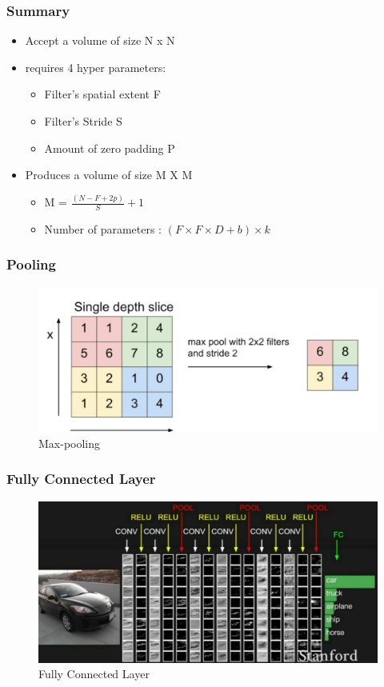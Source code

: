 \documentclass{beamer}
\begin{document}
\begin{frame}
\frametitle{Summary}
\begin{itemize}
	\item Accept a volume of size N x N 
	\item requires 4 hyper parameters:
	\begin{itemize}
		\item Filter's spatial extent F
		\item Filter's Stride S
		\item Amount of zero padding P
	\end{itemize}
	
     \item Produces a volume of size M X M
     \begin{itemize}
     	\item M = $ \frac{(N - F + 2p)}{S} + 1 $
     	\item Number of parameters : $ (F \times F \times D + b) \times k $
     \end{itemize}
\end{itemize}

\end{frame}
\begin{frame}
\frametitle{Pooling}

\begin{figure}
	\includegraphics[width=\linewidth]{Pics/pooling.png}
	\caption{Max-pooling}
\end{figure}

\end{frame}
\begin{frame}
\frametitle{Fully Connected Layer}

\begin{figure}
	\includegraphics[width=\linewidth]{Pics/cexample.png}
	\caption{Fully Connected Layer}
\end{figure}

\end{frame}
\end{document}
